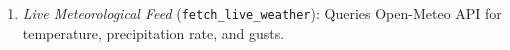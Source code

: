 \documentclass[conference]{IEEEtran}
\begin{document}
\begin{enumerate}
\item \textit{Live Meteorological Feed} (\texttt{fetch\_live\_weather}): Queries Open-Meteo API for temperature, precipitation rate, and gusts.
\end{enumerate}
\end{document}

